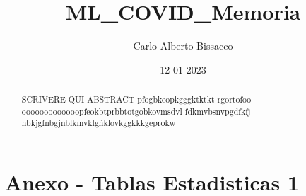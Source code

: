 \documentclass[
]{article}
\title{ML\_COVID\_Memoria}
\author{Carlo Alberto Bissacco}
\date{12-01-2023}
\begin{document}
\maketitle
\begin{abstract}
SCRIVERE QUI ABSTRACT pfogbkeopkgggktktkt rgortofoo
ooooooooooooopfeokbtprbbtotgobkovmsdvl fdkmvbsnvpgdfkfj
nbkjgfnbgjnblkmvklgñklovkggkkkgeprokw
\end{abstract}

{
\hypersetup{linkcolor=}
\setcounter{tocdepth}{2}
\tableofcontents
}
\pagebreak

\hypertarget{anexo---tablas-estadisticas-1}{%
\section{Anexo - Tablas Estadisticas
1}\label{anexo---tablas-estadisticas-1}}
\end{document}
